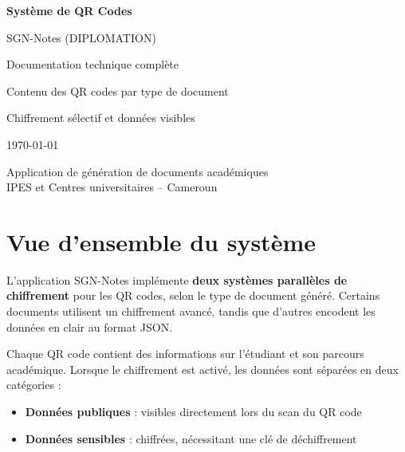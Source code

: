 \documentclass[a4paper,11pt]{article}
\begin{document}
\begin{titlepage}
\centering
\vspace*{3cm}
{\Huge\bfseries\textcolor{sectionblue}{Syst\`eme de QR Codes}\par}
\vspace{0.5cm}
{\LARGE\textcolor{sectionblue!70}{SGN-Notes (DIPLOMATION)}\par}
\vspace{2cm}
{\Large Documentation technique compl\`ete\par}
\vspace{1cm}
{\large Contenu des QR codes par type de document\par}
{\large Chiffrement s\'electif et donn\'ees visibles\par}
\vspace{3cm}
{\large\today\par}
\vspace{1cm}
{\normalsize Application de g\'en\'eration de documents acad\'emiques\\
IPES et Centres universitaires -- Cameroun\par}
\end{titlepage}

\tableofcontents
\newpage

\section{Vue d'ensemble du syst\`eme}

L'application SGN-Notes impl\'emente \textbf{deux syst\`emes parall\`eles de chiffrement} pour les QR codes, selon le type de document g\'en\'er\'e. Certains documents utilisent un chiffrement avanc\'e, tandis que d'autres encodent les donn\'ees en clair au format JSON.

\begin{tcolorbox}[colback=blue!5, colframe=sectionblue, title={\textbf{Principe g\'en\'eral}}]
Chaque QR code contient des informations sur l'\'etudiant et son parcours acad\'emique. Lorsque le chiffrement est activ\'e, les donn\'ees sont s\'epar\'ees en deux cat\'egories :
\begin{itemize}[noitemsep]
    \item \textcolor{publicgreen}{\textbf{Donn\'ees publiques}} : visibles directement lors du scan du QR code
    \item \textcolor{encryptedred}{\textbf{Donn\'ees sensibles}} : chiffr\'ees, n\'ecessitant une cl\'e de d\'echiffrement
\end{itemize}
\end{tcolorbox}
\end{document}
